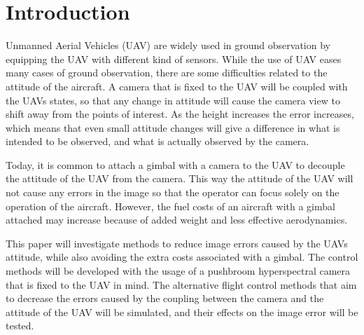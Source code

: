 \section{Introduction}

Unmanned Aerial Vehicles (UAV) are widely used in ground observation by equipping the UAV with different kind of sensors. While the use of UAV eases many cases of ground observation, there are some difficulties related to the attitude of the aircraft. A camera that is fixed to the UAV will be coupled with the UAVs states, so that any change in attitude will cause the camera view to shift away from the points of interest. As the height increases the error increases, which means that even small attitude changes will give a difference in what is intended to be observed, and what is actually observed by the camera.

Today, it is common to attach a gimbal with a camera to the UAV to decouple the attitude of the UAV from the camera. This way the attitude of the UAV will not cause any errors in the image so that the operator can focus solely on the operation of the aircraft. However, the fuel costs of an aircraft with a gimbal attached may increase because of added weight and less effective aerodynamics.

This paper will investigate methods to reduce image errors caused by the UAVs attitude, while also avoiding the extra costs associated with a gimbal. The control methods will be developed with the usage of a pushbroom hyperspectral camera that is fixed to the UAV in mind. The alternative flight control methods that aim to decrease the errors caused by the coupling between the camera and the attitude of the UAV will be simulated, and their effects on the image error will be tested.